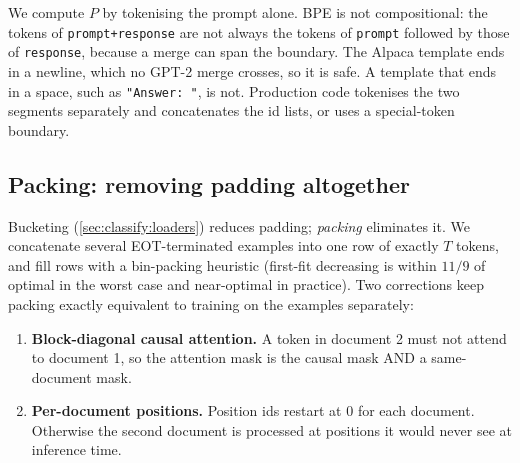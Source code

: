 \begin{pitfall}
We compute $P$ by tokenising the prompt alone. BPE is not compositional: the tokens of
\texttt{prompt+response} are not always the tokens of \texttt{prompt} followed by those
of \texttt{response}, because a merge can span the boundary. The Alpaca template ends
in a newline, which no GPT-2 merge crosses, so it is safe. A template that ends in a
space, such as \texttt{"Answer: "}, is not. Production code tokenises the two segments
separately and concatenates the id lists, or uses a special-token boundary.
\end{pitfall}

\subsection{Packing: removing padding altogether}\label{sec:instruct:packing}

Bucketing (\cref{sec:classify:loaders}) reduces padding; \emph{packing} eliminates it.
We concatenate several EOT-terminated examples into one row of exactly $T$ tokens, and
fill rows with a bin-packing heuristic (first-fit decreasing is within $11/9$ of optimal
in the worst case and near-optimal in practice). Two corrections keep packing exactly
equivalent to training on the examples separately:

\begin{enumerate}
\item \textbf{Block-diagonal causal attention.} A token in document 2 must not attend to
document 1, so the attention mask is the causal mask AND a same-document mask.
\item \textbf{Per-document positions.} Position ids restart at 0 for each document.
Otherwise the second document is processed at positions it would never see at
inference time.
\end{enumerate}

